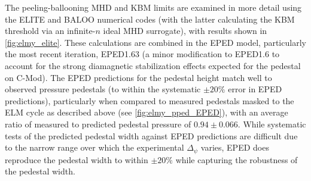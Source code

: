 \documentclass[ twoside,openright,titlepage,numbers=noenddot,headinclude,%
                footinclude=true,cleardoublepage=empty,abstractoff, %
                BCOR=5mm,paper=letter,fontsize=11pt,%
                ngerman,american,%
                ]{scrreprt}
\begin{document}
\begin{figure}[t]
 \pushtooutside
\end{figure}

The peeling-ballooning MHD and KBM limits are examined in more detail using the ELITE and BALOO numerical codes (with the latter calculating the KBM threshold via an infinite-$n$ ideal MHD surrogate), with results shown in \cref{fig:elmy_elite}.  These calculations are combined in the EPED model, particularly the most recent iteration, EPED1.63 (a minor modification to EPED1.6 to account for the strong diamagnetic stabilization effects expected for the pedestal on C-Mod).  The EPED predictions for the pedestal height match well to observed pressure pedestals (to within the systematic $\pm 20\%$ error in EPED predictions), particularly when compared to measured pedestals masked to the ELM cycle as described above (see \cref{fig:elmy_pped_EPED}), with an average ratio of measured to predicted pedestal pressure of $0.94 \pm 0.066$.  While systematic tests of the predicted pedestal width against EPED predictions are difficult due to the narrow range over which the experimental $\Delta_\psi$ varies, EPED does reproduce the pedestal width to within $\pm 20\%$ while capturing the robustness of the pedestal width.
\end{document}
